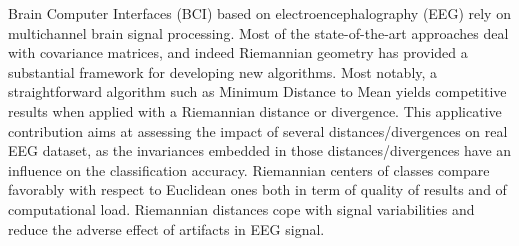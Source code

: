 Brain Computer Interfaces (BCI) based on electroencephalography (EEG) rely on multichannel brain signal processing. Most of the state-of-the-art approaches deal with covariance matrices, and indeed Riemannian geometry has provided a substantial framework for developing new algorithms. Most notably, a straightforward algorithm such as Minimum Distance to Mean yields competitive results when applied with a Riemannian distance or divergence. This applicative contribution aims at assessing the impact of several distances/divergences on real EEG dataset, as the invariances embedded in those distances/divergences have an influence on the classification accuracy. Riemannian centers of classes compare favorably with respect to Euclidean ones both in term of quality of results and of computational load. Riemannian distances cope with signal variabilities and reduce the adverse effect of artifacts in EEG signal.